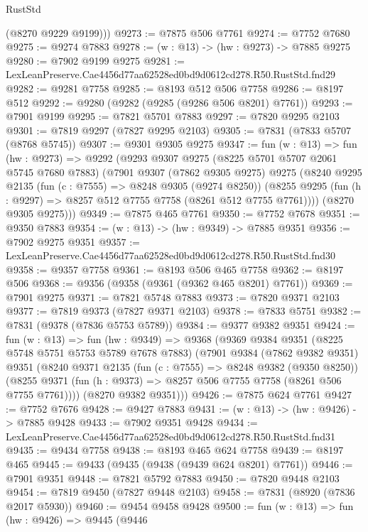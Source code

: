 \begin{lexlean}{RustStd}
\begin{coremodule}
        (@8270 @9229 @9199)))
@9273 := @7875 @506 @7761
@9274 := @7752 @7680
@9275 := @9274 @7883
@9278 := (w : @13) -> (hw : @9273) -> @7885 @9275
@9280 := @7902 @9199 @9275
@9281 := LexLeanPreserve.Cae4456d77aa62528ed0bd9d0612cd278.R50.RustStd.fnd29
@9282 := @9281 @7758
@9285 := @8193 @512 @506 @7758
@9286 := @8197 @512
@9292 := @9280 (@9282 (@9285 (@9286 @506 @8201) @7761))
@9293 := @7901 @9199
@9295 := @7821 @5701 @7883
@9297 := @7820 @9295 @2103
@9301 := @7819 @9297 (@7827 @9295 @2103)
@9305 := @7831 (@7833 @5707 (@8768 @5745))
@9307 := @9301 @9305 @9275
@9347 := fun (w : @13) =>
  fun (hw : @9273) =>
  @9292
    (@9293
      @9307
      @9275
      (@8225 @5701 @5707 @2061 @5745 @7680 @7883)
      (@7901
        @9307
        (@7862 @9305 @9275)
        @9275
        (@8240
          @9295
          @2135
          (fun (c : @7555) => @8248 @9305 (@9274 @8250))
          (@8255 @9295 (fun (h : @9297) => @8257 @512 @7755 @7758 (@8261 @512 @7755 @7761))))
        (@8270 @9305 @9275)))
@9349 := @7875 @465 @7761
@9350 := @7752 @7678
@9351 := @9350 @7883
@9354 := (w : @13) -> (hw : @9349) -> @7885 @9351
@9356 := @7902 @9275 @9351
@9357 := LexLeanPreserve.Cae4456d77aa62528ed0bd9d0612cd278.R50.RustStd.fnd30
@9358 := @9357 @7758
@9361 := @8193 @506 @465 @7758
@9362 := @8197 @506
@9368 := @9356 (@9358 (@9361 (@9362 @465 @8201) @7761))
@9369 := @7901 @9275
@9371 := @7821 @5748 @7883
@9373 := @7820 @9371 @2103
@9377 := @7819 @9373 (@7827 @9371 @2103)
@9378 := @7833 @5751
@9382 := @7831 (@9378 (@7836 @5753 @5789))
@9384 := @9377 @9382 @9351
@9424 := fun (w : @13) =>
  fun (hw : @9349) =>
  @9368
    (@9369
      @9384
      @9351
      (@8225 @5748 @5751 @5753 @5789 @7678 @7883)
      (@7901
        @9384
        (@7862 @9382 @9351)
        @9351
        (@8240
          @9371
          @2135
          (fun (c : @7555) => @8248 @9382 (@9350 @8250))
          (@8255 @9371 (fun (h : @9373) => @8257 @506 @7755 @7758 (@8261 @506 @7755 @7761))))
        (@8270 @9382 @9351)))
@9426 := @7875 @624 @7761
@9427 := @7752 @7676
@9428 := @9427 @7883
@9431 := (w : @13) -> (hw : @9426) -> @7885 @9428
@9433 := @7902 @9351 @9428
@9434 := LexLeanPreserve.Cae4456d77aa62528ed0bd9d0612cd278.R50.RustStd.fnd31
@9435 := @9434 @7758
@9438 := @8193 @465 @624 @7758
@9439 := @8197 @465
@9445 := @9433 (@9435 (@9438 (@9439 @624 @8201) @7761))
@9446 := @7901 @9351
@9448 := @7821 @5792 @7883
@9450 := @7820 @9448 @2103
@9454 := @7819 @9450 (@7827 @9448 @2103)
@9458 := @7831 (@8920 (@7836 @2017 @5930))
@9460 := @9454 @9458 @9428
@9500 := fun (w : @13) =>
  fun (hw : @9426) =>
  @9445
    (@9446

\end{coremodule}
\end{lexlean}

